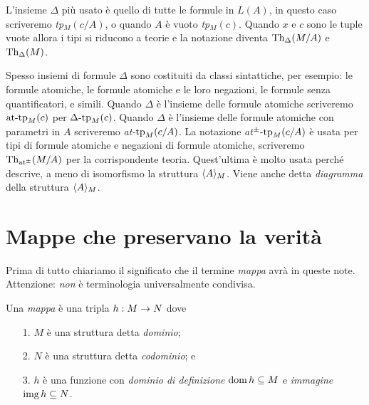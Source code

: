 L'insieme $\Delta$ pi\`u usato \`e quello di tutte le formule in $L(A)$, in questo caso scriveremo \emph{tp$_M(c/A)$}, o quando $A$ \`e vuoto \emph{tp$_M(c)$}. Quando $x$ e $c$ sono le tuple vuote allora i tipi si riducono a teorie e la notazione diventa \emph{$\textrm{Th}_\Delta(M/A)$} e \emph{$\textrm{Th}_\Delta(M)$}.

Spesso insiemi di formule $\Delta$ sono costituiti da classi sintattiche, per esempio: le formule atomiche, le formule atomiche e le loro negazioni, le formule senza quantificatori, e simili.  Quando $\Delta$ \`e l'insieme delle formule atomiche scriveremo \emph{$\textrm{at\mbox{-}tp}_M(c)$\/} per $\Delta\mbox{-}\textrm{tp}_M(c)$. Quando $\Delta$ \`e l'insieme delle formule atomiche con parametri in $A$ scriveremo \emph{\textrm{at}-$\textrm{tp}_M(c/A)$}. La notazione \emph{\textrm{at}$^\pm\mbox{-}\textrm{tp}_M(c/A)$\/} \`e usata per tipi di formule atomiche e negazioni di formule atomiche, scriveremo \emph{$\textrm{Th}_{\textrm{\scriptsize at}^\pm}(M/A)$\/} per la corrispondente teoria. Quest'ultima \`e molto usata perch\'e descrive, a meno di isomorfismo la struttura $\langle A\rangle_M$. Viene anche detta \emph{diagramma\/} della struttura $\langle A\rangle_M$.



\section{Mappe che preservano la verit\`a}

Prima di tutto chiariamo il significato che il termine \emph{mappa\/} avr\`a in queste note. Attenzione: \textit{non\/} \`e terminologia universalmente condivisa.

\begin{definition}\label{defmappa}
Una \emph{mappa\/} \`e una tripla $h:M\rightarrow N$ dove 
\begin{itemize}
\item[1.] $M$ \`e una struttura detta \emph{dominio};
\item[2.] $N$ \`e una struttura detta \emph{codominio}; e
\item[3.] $h$ \`e una funzione con \emph{dominio di definizione\/} $\mathop{\rm dom} h\subseteq M$ e \emph{immagine} $\mathop{\rm img} h\subseteq N$.\QED
\end{itemize}
\end{definition}

